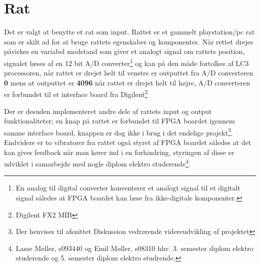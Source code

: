 \section{Rat}
Det er valgt at benytte et rat som input. Rattet er et gammelt playstation/pc rat som er skilt ad for at bruge rattets egenskaber og komponenter. Når rettet drejes påvirkes en variabel modstand som giver et analogt signal om rattets position, signalet læses af en 12 bit A/D converter\footnote{En analog til digital converter konventerer et analogt signal til et digitalt signal således at FPGA boardet kan læse fra ikke-digitale komponenter.} og kan på den måde fortolkes af LC3 processoren, når rattet er drejet helt til venstre er outputtet fra A/D converteren \textbf{0} mens at outputtet er \textbf{4096} når rattet er drejet helt til højre, A/D converteren er forbundet til et interface board fra Digilent\textregistered\footnote{Digilent FX2 MIB}

Der er desuden implementeret andre dele af rattets input og output funktionaliteter; en knap på rattet er forbundet til FPGA boardet igennem samme interface board, knappen er dog ikke i brug i det endelige projekt\footnote{Der henvises til afsnittet Diskussion vedrørende videreudvikling af projektet}. Endvidere er to vibratorer fra rattet også styret af FPGA boardet således at det kan gives feedback når man kører ind i en forhindring, styringen af disse er udviklet i samarbejde med nogle diplom elektro studerende\footnote{Lasse Møller, s093440 og Emil Møller, s08310 hhv. 3. semester diplom elektro studerende og 5. semester diplom elektro studrende.}.